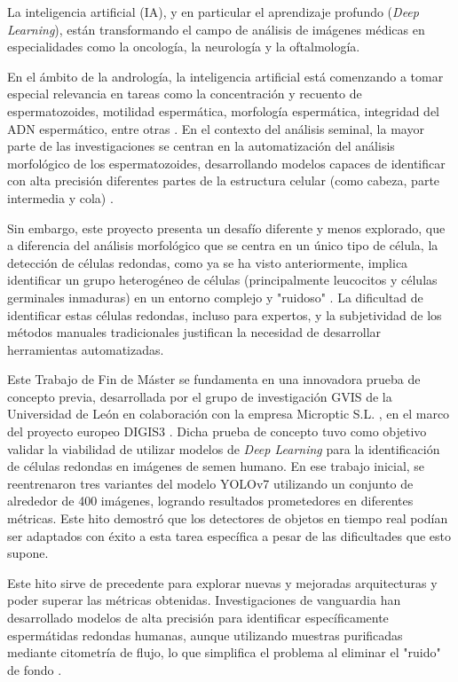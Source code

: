 \documentclass[12pt,a4paper,onecolumn,oneside]{report}
\begin{document}
La inteligencia artificial (IA), y en particular el aprendizaje profundo (\textit{Deep Learning}), están transformando el campo de análisis de imágenes médicas en especialidades como la oncología, la neurología y la oftalmología.

En el ámbito de la andrología, la inteligencia artificial está comenzando a tomar especial relevancia en tareas como la concentración y recuento de espermatozoides, motilidad espermática, morfología espermática, integridad del ADN espermático, entre otras \cite{PannerSelvam}. En el contexto del análisis seminal, la mayor parte de las investigaciones se centran
en la automatización del análisis morfológico de los espermatozoides, desarrollando modelos capaces de identificar con alta precisión diferentes partes de la estructura celular (como cabeza, parte intermedia y cola) \cite{Maalej2025}.

Sin embargo, este proyecto presenta un desafío diferente y menos explorado, que a diferencia del análisis morfológico que se centra en un único tipo de célula,
la detección de células redondas, como ya se ha visto anteriormente, implica identificar un grupo heterogéneo de células (principalmente leucocitos y células germinales inmaduras) en un entorno complejo y "ruidoso" \cite{OMS}\cite{BJBS}.
La dificultad de identificar estas células redondas, incluso para expertos, y la subjetividad de los métodos manuales tradicionales \cite{Johanisson2000} justifican la necesidad de desarrollar herramientas automatizadas.

Este Trabajo de Fin de Máster se fundamenta en una innovadora prueba de concepto previa, desarrollada por el grupo de investigación GVIS de la Universidad de León en colaboración con la empresa Microptic S.L. \cite{microptic}, en el marco del proyecto europeo DIGIS3 \cite{digis3}. 
Dicha prueba de concepto tuvo como objetivo validar la viabilidad de utilizar modelos de \textit{Deep Learning} para la identificación de células redondas en imágenes de semen humano. En ese trabajo inicial, se reentrenaron tres variantes del modelo YOLOv7 utilizando un conjunto de 
alrededor de 400 imágenes, logrando resultados prometedores en diferentes métricas. Este hito demostró que los detectores de objetos en tiempo real podían ser adaptados con éxito a esta tarea específica a pesar de las dificultades que esto supone.

Este hito sirve de precedente para explorar nuevas y mejoradas arquitecturas y poder superar las métricas obtenidas. Investigaciones de vanguardia han desarrollado modelos de alta precisión para identificar específicamente espermátidas redondas humanas, 
aunque utilizando muestras purificadas mediante citometría de flujo, lo que simplifica el problema al eliminar el "ruido" de fondo \cite{roundsCellsSpermatid}.
\end{document}

